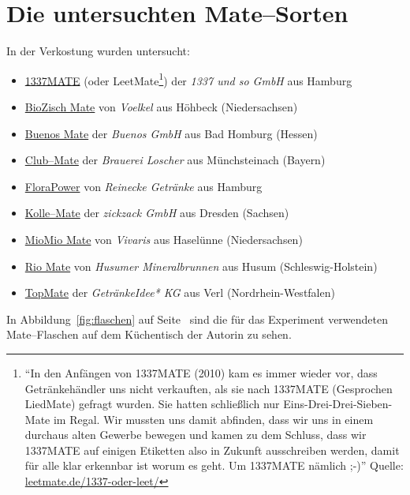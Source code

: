 \documentclass[11pt,a4paper,ngerman]{article}
\begin{document}
\section{Die untersuchten Mate--Sorten}
In der Verkostung wurden untersucht:
\begin{itemize}
 \item \href{http://leetmate.de/}{1337MATE} (oder LeetMate\footnote{%
      "`In den Anfängen von 1337MATE (2010) kam es immer wieder vor, dass Getränkehändler uns nicht verkauften, als sie nach 1337MATE (Gesprochen LiedMate) gefragt wurden. Sie hatten schließlich nur Eins-Drei-Drei-Sieben-Mate im Regal.
      Wir mussten uns damit abfinden, dass wir uns in einem durchaus alten Gewerbe bewegen und kamen zu dem Schluss, dass wir 1337MATE auf einigen Etiketten also in Zukunft ausschreiben werden, damit für alle klar erkennbar ist worum es geht. Um 1337MATE nämlich ;-)"' Quelle: \href{http://leetmate.de/1337-oder-leet/}{leetmate.de/1337-oder-leet/} })  der \textit{1337 und so GmbH} aus Hamburg

 \item \href{http://www.voelkeljuice.de/sortiment/title/biozisch-mate/}{BioZisch Mate} von \textit{Voelkel} aus Höhbeck (Niedersachsen)

 \item \href{http://www.buenos-icetea.com/buenos-mate/}{Buenos Mate} der \textit{Buenos GmbH} aus Bad Homburg (Hessen)

 \item \href{http://www.clubmate.de/}{Club--Mate} der \textit{Brauerei Loscher} aus Münchsteinach (Bayern)

 \item \href{http://www.flora-power.de/}{FloraPower} von \textit{Reinecke Getränke} aus Hamburg

 \item \href{http://kolle-mate.de/http://kolle-mate.de/}{Kolle--Mate} der \textit{zickzack GmbH} aus Dresden (Sachsen)

 \item \href{http://www.vivaris.net/#c17}{MioMio Mate} von \textit{Vivaris} aus Haselünne (Niedersachsen)

 \item \href{http://www.husumer-mineralbrunnen.de/produkte/rio-mate/}{Rio Mate} von \textit{Husumer Mineralbrunnen} aus Husum  (Schleswig-Holstein)
 \item \href{http://www.top-mate.de/}{TopMate} der \textit{GetränkeIdee* KG} aus Verl (Nordrhein-Westfalen)
 \end{itemize}
In Abbildung~\ref{fig:flaschen} auf Seite~\pageref{fig:flaschen} sind die für das Experiment verwendeten Mate--Flaschen auf dem Küchentisch der Autorin zu sehen.
\end{document}
